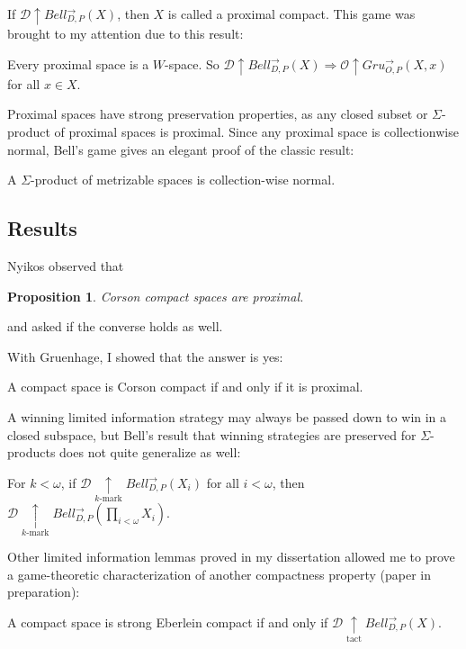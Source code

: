 \documentclass{beamer}
\newtheorem{proposition}[theorem]{Proposition}
\theoremstyle{definition}
\newcommand{\win}{\uparrow}
\newcommand{\tactwin}{\underset{\text{tact}}{\uparrow}}
\newcommand{\kmarkwin}[1]{\underset{#1\text{-mark}}{\uparrow}}
\newcommand{\gruConGame}[2]{Gru_{O,P}^{\to}\left({#1},{#2}\right)}
\newcommand{\bellAbsConGame}[1]{Bell_{D,P}^{\to}\left({#1}\right)}
\newcommand{\<}{\langle}
\renewcommand{\>}{\rangle}
\newcommand{\pl}[1]{\mathscr{#1}}
\begin{document}
\begin{frame}
  If $\pl D\win \bellAbsConGame{X}$, then $X$ is called a proximal compact.
  This game was brought to my attention due to this result: \cite{MR3239205}

  \begin{theorem}
    Every proximal space is a $W$-space. So
    $\pl D\win\bellAbsConGame{X} \Rightarrow \pl O\win\gruConGame{X}{x}$
    for all $x\in X$.
  \end{theorem}

  \vpause

  Proximal spaces have strong preservation properties, as any
  closed subset or $\Sigma$-product of proximal spaces is proximal. Since
  any proximal space is collectionwise normal, Bell's game gives an elegant
  proof of the classic result:

  \begin{theorem}
    A $\Sigma$-product of metrizable spaces is collection-wise normal.
  \end{theorem}
\end{frame}

\subsection{Results}

\begin{frame}
  Nyikos \cite{nyikosProximalPreprint} observed that
  \begin{proposition}
    Corson compact spaces are proximal.
  \end{proposition}
  and asked if the converse holds as well.

  \vpause

  With Gruenhage, I showed that the answer is yes:
  \begin{theorem}
    A compact space is Corson compact if and only if it is proximal.
  \end{theorem}
\end{frame}

\begin{frame}\small
  A winning limited information strategy may always be passed down
  to win in a closed subspace, but Bell's result that winning strategies
  are preserved for $\Sigma$-products does not quite generalize as well:

  \begin{theorem}
    For $k<\omega$, if $\pl D\kmarkwin{k}\bellAbsConGame{X_i}$ for all $i<\omega$,
    then $\pl D\kmarkwin{k}\bellAbsConGame{\prod_{i<\omega} X_i}$.
  \end{theorem}

  \pause

  Other limited information lemmas proved in my dissertation allowed me
  to prove a game-theoretic characterization of another compactness property
  (paper in preparation):

  \begin{theorem}
    A compact space is strong Eberlein compact if and only if
    $\pl D\tactwin\bellAbsConGame{X}$.
  \end{theorem}
\end{frame}
\end{document}
